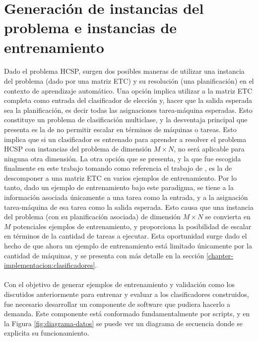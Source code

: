 \section{Generación de instancias del problema e instancias de entrenamiento} \label{chapter-implementacion:data}

\paragraph{} Dado el problema HCSP, surgen dos posibles maneras de utilizar una instancia del problema (dado por una matriz ETC) y su resolución (una planificación) en el contexto de aprendizaje automático.
Una opción implica utilizar a la matriz ETC completa como entrada del clasificador de elección y, hacer que la salida esperada sea la planificación, es decir todas las asignaciones tarea-máquina esperadas.
Esto constituye un problema de clasificación multiclase, y la desventaja principal que presenta es la de no permitir escalar en términos de máquinas o tareas.
Esto implica que si un clasificador es entrenado para aprender a resolver el problema HCSP con instancias del problema de dimensión $M \times N$, no será aplicable para ninguna otra dimensión.
La otra opción que se presenta, y la que fue escogida finalmente en este trabajo tomando como referencia el trabajo de \citet{savant-original}, es la de descomponer a una matriz ETC en varios ejemplos de entrenamiento.
Por lo tanto, dado un ejemplo de entrenamiento bajo este paradigma, se tiene a la información asociada únicamente a una tarea como la entrada, y a la asignación tarea-máquina de esa tarea como la salida esperada.
Esto causa que una instancia del problema (con su planificación asociada) de dimensión $M \times N$ se convierta en $M$ potenciales ejemplos de entrenamiento, y proporciona la posibilidad de escalar en términos de la cantidad de tareas a ejecutar.
Esta oportunidad surge dado el hecho de que ahora un ejemplo de entrenamiento está limitado únicamente por la cantidad de máquinas, y se presenta con más detalle en la sección \ref{chapter-implementacion:clasificadores}.


\paragraph{} Con el objetivo de generar ejemplos de entrenamiento y validación como los discutidos anteriormente para entrenar y evaluar a los clasificadores construidos, fue necesario desarrollar un componente de software que pudiera hacerlo a demanda.
Este componente está conformado fundamentalmente por scripts, y en la Figura \ref{fig:diagrama-datos} se puede ver un diagrama de secuencia donde se explicita su funcionamiento. 

